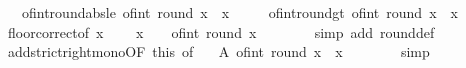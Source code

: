 \begin{isabellebody}
\ \ \ of{\isacharunderscore}{\kern0pt}int{\isacharunderscore}{\kern0pt}round{\isacharunderscore}{\kern0pt}abs{\isacharunderscore}{\kern0pt}le{\isacharcolon}{\kern0pt}\ {\isachardoublequoteopen}{\isasymbar}of{\isacharunderscore}{\kern0pt}int\ {\isacharparenleft}{\kern0pt}round\ x{\isacharparenright}{\kern0pt}\ {\isacharminus}{\kern0pt}\ x{\isasymbar}\ {\isasymle}\ {}{\isacharslash}{\kern0pt}{}{\isachardoublequoteclose}\isanewline
\ \ \ of{\isacharunderscore}{\kern0pt}int{\isacharunderscore}{\kern0pt}round{\isacharunderscore}{\kern0pt}gt{\isacharcolon}{\kern0pt}\ {\isachardoublequoteopen}of{\isacharunderscore}{\kern0pt}int\ {\isacharparenleft}{\kern0pt}round\ x{\isacharparenright}{\kern0pt}\ {\isachargreater}{\kern0pt}\ x\ {\isacharminus}{\kern0pt}\ {}{\isacharslash}{\kern0pt}{}{\isachardoublequoteclose}\isanewline
%
\isadelimproof
%
\endisadelimproof
%
\isatagproof
{}\isamarkupfalse%
\ {\isacharminus}{\kern0pt}\isanewline
\ \ \isamarkupfalse%
\ floor{\isacharunderscore}{\kern0pt}correct{\isacharbrackleft}{\kern0pt}of\ {\isachardoublequoteopen}x\ {\isacharplus}{\kern0pt}\ {}{\isacharslash}{\kern0pt}{}{\isachardoublequoteclose}{\isacharbrackright}{\kern0pt}\ \isamarkupfalse%
\ {\isachardoublequoteopen}x\ {\isacharplus}{\kern0pt}\ {}{\isacharslash}{\kern0pt}{}\ {\isacharless}{\kern0pt}\ of{\isacharunderscore}{\kern0pt}int\ {\isacharparenleft}{\kern0pt}round\ x{\isacharparenright}{\kern0pt}\ {\isacharplus}{\kern0pt}\ {}{\isachardoublequoteclose}\isanewline
\ \ \ \ \isamarkupfalse%
\ {\isacharparenleft}{\kern0pt}simp\ add{\isacharcolon}{\kern0pt}\ round{\isacharunderscore}{\kern0pt}def{\isacharparenright}{\kern0pt}\isanewline
\ \ \isamarkupfalse%
\ add{\isacharunderscore}{\kern0pt}strict{\isacharunderscore}{\kern0pt}right{\isacharunderscore}{\kern0pt}mono{\isacharbrackleft}{\kern0pt}OF\ this{\isacharcomma}{\kern0pt}\ of\ {\isachardoublequoteopen}{\isacharminus}{\kern0pt}{}{\isachardoublequoteclose}{\isacharbrackright}{\kern0pt}\ \isamarkupfalse%
\ A{\isacharcolon}{\kern0pt}\ {\isachardoublequoteopen}of{\isacharunderscore}{\kern0pt}int\ {\isacharparenleft}{\kern0pt}round\ x{\isacharparenright}{\kern0pt}\ {\isachargreater}{\kern0pt}\ x\ {\isacharminus}{\kern0pt}\ {}{\isacharslash}{\kern0pt}{}{\isachardoublequoteclose}\isanewline
\ \ \ \ \isamarkupfalse%
\ simp\isanewline
\ \ \isamarkupfalse%

\end{isabellebody}
